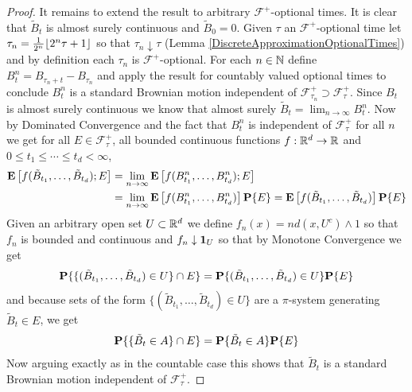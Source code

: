 \begin{proof}
It remains to extend the result to arbitrary $\mathcal{F}^+$-optional times.  It is clear that $\tilde{B}_t$ is
almost surely continuous and $\tilde{B}_0 = 0$.  Given
$\tau$ an $\mathcal{F}^+$-optional time let $\tau_n = \frac{1}{2^n}
\lfloor 2^n \tau + 1 \rfloor$ so that $\tau_n \downarrow \tau$ (Lemma
\ref{DiscreteApproximationOptionalTimes}) and by definition each
$\tau_n$ is $\mathcal{F}^+$-optional.  For each $n \in \mathbb{N}$ define $B^n_t = B_{\tau_n + t} -
B_{\tau_n}$ and apply the result for countably valued optional times
to conclude $B^n_t$ is a standard Brownian motion independent of
$\mathcal{F}^+_{\tau_n} \supset \mathcal{F}^+_{\tau} $.  Since $B_t$ is almost surely
continuous we know that almost surely $\tilde{B}_t = \lim_{n \to \infty}
B^n_t$.  Now by Dominated Convergence and the fact that $B^n_t$ is
independent of $\mathcal{F}^+_{\tau}$ for all $n$ we get for all $E
\in \mathcal{F}^+_{\tau}$, all
bounded continuous functions $f : \mathbb{R}^d \to \mathbb{R}$ and $0 \leq t_1 \leq
\dotsb \leq t_d < \infty$,
\begin{align*}
\textbf{E}\left[f(\tilde{B}_{t_1}, \dotsc, \tilde{B}_{t_d}) ; E\right] &= 
\lim_{n \to  \infty} \textbf{E}\left[f(B^n_{t_1}, \dotsc, B^n_{t_d}) ; E\right] \\
&= \lim_{n \to  \infty} \textbf{E}\left[f(B^n_{t_1}, \dotsc, B^n_{t_d})\right] \textbf{P}\{E\}
=\textbf{E}\left[f(\tilde{B}_{t_1}, \dotsc, \tilde{B}_{t_d})\right] \textbf{P}\{E\} 
\end{align*}
Given an arbitrary open set $U \subset \mathbb{R}^d$ we define $f_n(x) = n
d(x, U^c) \wedge 1$ so that $f_n$ is bounded and continuous and $f_n
\downarrow \textbf{1}_{U}$ so that by Monotone Convergence we get
\begin{align*}
\textbf{P}\{ \lbrace (\tilde{B}_{t_1}, \dotsc, \tilde{B}_{t_d}) \in U \rbrace
  \cap E\} = \textbf{P}\{ (\tilde{B}_{t_1}, \dotsc, \tilde{B}_{t_d}) \in U \} \textbf{P}\{E\}
\end{align*}
and because sets of the form $\lbrace (\tilde{B}_{t_1}, \dotsc, \tilde{B}_{t_d})
\in U \rbrace$ are a $\pi$-system generating $\tilde{B}_t \in E$, we get 
\begin{align*}
\textbf{P}\{ \lbrace \tilde{B}_t \in A \rbrace
  \cap E\} = \textbf{P}\{ \tilde{B}_t \in A \} \textbf{P}\{E\}
\end{align*}
Now arguing exactly as in the countable case this shows that $\tilde{B}_t$
is a standard Brownian motion independent of $\mathcal{F}^+_\tau$.
\end{proof}

